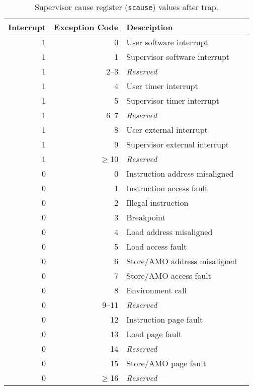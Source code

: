 \begin{table*}[h!]
\begin{center}
\begin{tabular}{|r|r|l|l|}

  \hline
  Interrupt & Exception Code  & Description \\
  \hline	 
  1         & 0               & User software interrupt \\
  1         & 1               & Supervisor software interrupt \\
  1         & 2--3            & {\em Reserved} \\
  1         & 4               & User timer interrupt \\
  1         & 5               & Supervisor timer interrupt \\
  1         & 6--7            & {\em Reserved} \\
  1         & 8               & User external interrupt \\
  1         & 9               & Supervisor external interrupt \\
  1         & $\ge$10          & {\em Reserved} \\ \hline
  0         & 0               & Instruction address misaligned \\
  0         & 1               & Instruction access fault \\
  0         & 2               & Illegal instruction \\   
  0         & 3               & Breakpoint \\
  0         & 4               & Load address misaligned \\
  0         & 5               & Load access fault \\
  0         & 6               & Store/AMO address misaligned \\
  0         & 7               & Store/AMO access fault \\
  0         & 8               & Environment call \\
  0         & 9--11           & {\em Reserved} \\
  0         & 12              & Instruction page fault \\
  0         & 13              & Load page fault \\
  0         & 14              & {\em Reserved} \\
  0         & 15              & Store/AMO page fault \\
  0         & $\ge$16         & {\em Reserved} \\
  \hline
\end{tabular}
\end{center}
\caption{Supervisor cause register ({\tt scause}) values after trap.}
\label{scauses}
\end{table*}

